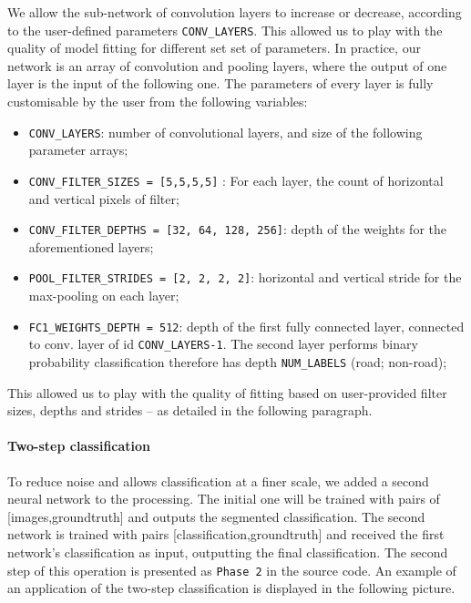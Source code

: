 \documentclass[fleqn,9 pt]{SelfArx} %
\begin{document}
\begin{sloppypar}
We allow the sub-network of convolution layers to increase or decrease, according to the user-defined parameters \texttt{CONV\_LAYERS}. This allowed us to play with the quality of model fitting for different set set of parameters. In practice, our network is an array of convolution and pooling layers, where the output of one layer is the input of the following one. The parameters of every layer is fully customisable by the user from the following variables:
\begin{itemize}
\item \texttt{CONV\_LAYERS}: number of convolutional layers, and size of the following parameter arrays;
\item \texttt{CONV\_FILTER\_SIZES = [5,5,5,5]} : For each layer, the count of horizontal and vertical pixels of filter;
\item \texttt{CONV\_FILTER\_DEPTHS = [32, 64, 128, 256]}: depth of the weights for the aforementioned layers;
\item \texttt{POOL\_FILTER\_STRIDES = [2, 2, 2, 2]}: horizontal and vertical stride for the max-pooling on each layer;
\item \texttt{FC1\_WEIGHTS\_DEPTH = 512}: depth of the first fully connected layer, connected to conv. layer of id \texttt{CONV\_LAYERS-1}. The second layer performs binary probability classification therefore has depth \texttt{NUM\_LABELS} (road; non-road);
\end{itemize}
  This allowed us to play with the quality of fitting based on user-provided filter sizes, depths and strides -- as detailed in the following paragraph.
 
\paragraph{Two-step classification} 

To reduce noise and allows classification at a finer scale, we added a second neural network to the processing. The initial one will be trained with pairs of [images,groundtruth] and outputs the segmented classification. The second network is trained with pairs [classification,groundtruth] and received the first network's classification as input, outputting the final classification. The second step of this operation is presented as \texttt{Phase 2} in the source code. An example of an application of the two-step classification is displayed in the following picture.


\end{sloppypar}
\end{document}
